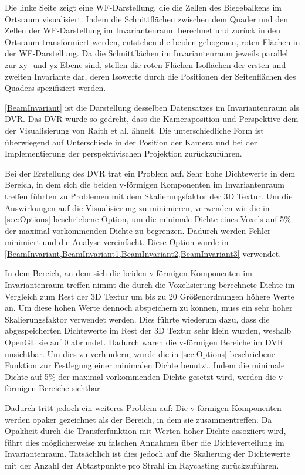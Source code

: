 \documentclass[a4paper,fontsize=12pt,toc=bib,parskip=half,ngerman]{scrartcl}
\begin{document}
Die linke Seite zeigt eine WF-Darstellung, die die Zellen des Biegebalkens im Ortsraum visualisiert. Indem die Schnittfl\"achen zwischen dem Quader und den Zellen der WF-Darstellung im Invariantenraum berechnet und zur\"uck in den Ortsraum transformiert werden, entstehen die beiden gebogenen, roten Fl\"achen in der WF-Darstellung. Da die Schnittfl\"achen im Invariantenraum jeweils parallel zur xy- und yz-Ebene sind, stellen die roten Fl\"achen Isofl\"achen der ersten und zweiten Invariante dar, deren Isowerte durch die Positionen der Seitenfl\"achen des Quaders spezifiziert werden.

\cref{BeamInvariant} ist die Darstellung desselben Datensatzes im Invariantenraum als DVR. Das DVR wurde so gedreht, dass die Kameraposition und Perspektive dem der Visualisierung von Raith et al. \"ahnelt. Die unterschiedliche Form ist \"uberwiegend auf Unterschiede in der Position der Kamera und bei der Implementierung der perspektivischen Projektion zur\"uckzuf\"uhren.

Bei der Erstellung des DVR trat ein Problem auf. Sehr hohe Dichtewerte in dem Bereich, in dem sich die beiden v-f\"ormigen Komponenten im Invariantenraum treffen f\"uhrten zu Problemen mit dem Skalierungsfaktor der 3D Textur. Um die Auswirkungen auf die Visualisierung zu minimieren, verwenden wir die in \ref{sec:Options} beschriebene Option, um die minimale Dichte eines Voxels auf 5\% der maximal vorkommenden Dichte zu begrenzen. Dadurch werden Fehler minimiert und die Analyse vereinfacht. Diese Option wurde in \cref{BeamInvariant,BeamInvariant1,BeamInvariant2,BeamInvariant3} verwendet.


In dem Bereich, an dem sich die beiden v-f\"ormigen Komponenten im Invariantenraum treffen nimmt die durch die Voxelisierung berechnete Dichte im Vergleich zum Rest der 3D Textur um bis zu 20 Gr\"o{\ss}enordnungen h\"ohere Werte an. Um diese hohen Werte dennoch abspeichern zu k\"onnen, muss ein sehr hoher Skalierungsfaktor verwendet werden. Dies f\"uhrte wiederum dazu, dass die abgespeicherten Dichtewerte im Rest der 3D Textur sehr klein wurden, weshalb OpenGL sie auf 0 abrundet. Dadurch waren die v-f\"ormigen Bereiche im DVR unsichtbar. Um dies zu verhindern, wurde die in \cref{sec:Options} beschriebene Funktion zur Festlegung einer minimalen Dichte benutzt. Indem die minimale Dichte auf 5\% der maximal vorkommenden Dichte gesetzt wird, werden die v-f\"ormigen Bereiche sichtbar.


Dadurch tritt jedoch ein weiteres Problem auf: Die v-f\"ormigen Komponenten werden opaker gezeichnet als der Bereich, in dem sie zusammentreffen. Da Opakheit durch die Transferfunktion mit Werten hoher Dichte assoziiert wird, f\"uhrt dies m\"oglicherweise zu falschen Annahmen \"uber die Dichteverteilung im Invariantenraum. Tats\"achlich ist dies jedoch auf die Skalierung der Dichtewerte mit der Anzahl der Abtastpunkte pro Strahl im Raycasting zur\"uckzuf\"uhren.
\end{document}
